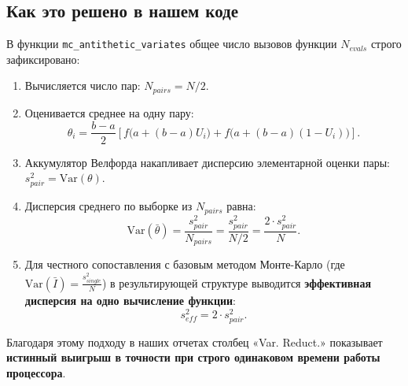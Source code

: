 \documentclass[11pt,a4paper]{article}
\begin{document}
\subsection{Как это решено в нашем коде}
В функции \texttt{mc\_antithetic\_variates} общее число вызовов функции $N_{evals}$ строго зафиксировано:
\begin{enumerate}
    \item Вычисляется число пар: $N_{pairs} = N / 2$.
    \item Оценивается среднее на одну пару:
    \begin{equation}
        \theta_i = \frac{b - a}{2} \left[ f\big(a + (b - a)U_i\big) + f\big(a + (b - a)(1 - U_i)\big) \right].
    \end{equation}
    \item Аккумулятор Велфорда накапливает дисперсию элементарной оценки пары: $s_{pair}^2 = \mathrm{Var}(\theta)$.
    \item Дисперсия среднего по выборке из $N_{pairs}$ равна:
    \begin{equation}
        \mathrm{Var}(\bar{\theta}) = \frac{s_{pair}^2}{N_{pairs}} = \frac{s_{pair}^2}{N / 2} = \frac{2 \cdot s_{pair}^2}{N}.
    \end{equation}
    \item Для честного сопоставления с базовым методом Монте-Карло (где $\mathrm{Var}(\bar{I}) = \frac{s_{single}^2}{N}$) в результирующей структуре выводится \textbf{эффективная дисперсия на одно вычисление функции}:
    \begin{equation}
        s_{eff}^2 = 2 \cdot s_{pair}^2.
    \end{equation}
\end{enumerate}

Благодаря этому подходу в наших отчетах столбец «Var. Reduct.» показывает \textbf{истинный выигрыш в точности при строго одинаковом времени работы процессора}.
\end{document}
